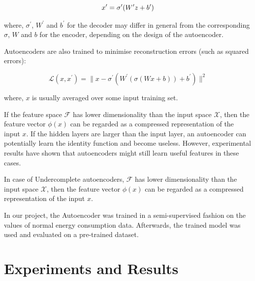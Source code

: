 \documentclass[conference]{IEEEtran}
\begin{document}
\begin{equation}
\boldmath{x^{\prime}} = \sigma^{\prime}(W^{\prime}z+b^{\prime})
\end{equation}

where, $\sigma^{\prime}$, $W^{\prime}$ and $b^{\prime}$ for the decoder may differ in general from the corresponding $\sigma$, $W$ and $b$ for the encoder, depending on the design of the autoencoder.

Autoencoders are also trained to minimise reconstruction errors (such as squared errors):

\begin{equation}
\mathcal{L}(x,x^{\prime}) = \|x- \sigma^{\prime}(W^{\prime}(\sigma(Wx+b))+b^{\prime})\|^2
\end{equation}

where, $x$ is usually averaged over some input training set.

If the feature space $\mathcal{F}$  has lower dimensionality than the input space $\mathcal{X}$, then the feature vector $\phi(x)$ can be regarded as a compressed representation of the input $x$.  If the hidden layers are larger than the input layer, an autoencoder can potentially learn the identity function and become useless. However, experimental results have shown that autoencoders might still learn useful features in these cases.


In case of Undercomplete autoencoders, $\mathcal{F}$ has lower dimensionality than the input space $\mathcal{X}$, then the feature vector $\phi(x)$  can be regarded as a compressed representation of the input $x$.

In our project, the Autoencoder was trained in a semi-supervised fashion on the values of normal energy consumption data. Afterwards, the trained model was used and evaluated on a pre-trained dataset. 


\section{\label{sec:level1}	Experiments and Results}
\end{document}
